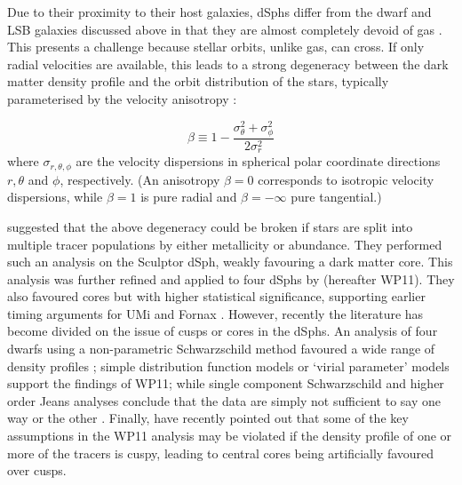 Due to their proximity to their host galaxies, dSphs differ from the
dwarf and LSB galaxies discussed above in that they are almost
completely devoid of gas \citep[e.g.][]{Gatto+2013}. This presents a
challenge because stellar orbits, unlike gas, can cross. If only
radial velocities are available, this leads to a strong degeneracy
between the dark matter density profile and the orbit distribution of
the stars, typically parameterised by the velocity anisotropy
\citep[e.g.][]{Wilkinson+2002}:

\begin{equation} 
    \label{eqn:beta}
    \beta \equiv 1 - \frac{\sigma_\theta^2 + \sigma_\phi^2}{2\sigma_r^2}
\end{equation}
where $\sigma_{r,\theta,\phi}$ are the velocity dispersions in
spherical polar coordinate directions $r, \theta$ and $\phi$,
respectively. (An anisotropy $\beta = 0$ corresponds to isotropic
velocity dispersions, while $\beta = 1$ is pure radial and $\beta =
-\infty$ pure tangential.)

\citet{Battaglia+2008} suggested that the above degeneracy could be broken if
stars are split into multiple tracer populations by either metallicity or
abundance. They performed such an analysis on the Sculptor dSph, weakly
favouring a dark matter core. This analysis was further refined and applied to
four dSphs by \citet{WalkerPenarrubia2011} (hereafter WP11). They also favoured
cores but with higher statistical significance, supporting earlier timing
arguments for UMi and Fornax \citep{Kleyna+2003, Goerdt+2006, Read+2006,
  Cole+2012}. However, recently the literature has become divided on the issue
of cusps or cores in the dSphs. An analysis of four dwarfs using a
non-parametric Schwarzschild method \citep{Schwarzschild1979} favoured a wide
range of density profiles \citep{Jardel+2013}; simple distribution function
models \citep{AmoriscoEvans2012} or `virial parameter' models \citep{Evans+2011}
support the findings of WP11; while single component Schwarzschild
\citep{BreddelsHelmi2013} and higher order Jeans \citep{RichardsonFairbairn2013}
analyses conclude that the data are simply not sufficient to say one way or the
other \citep[see also the discussion in][]{2014arXiv1404.5958B}. Finally,
\citet{2014arXiv1406.6079S} have recently pointed out that some of the key
assumptions in the WP11 analysis may be violated if the density profile of one
or more of the tracers is cuspy, leading to central cores being artificially
favoured over
cusps.


